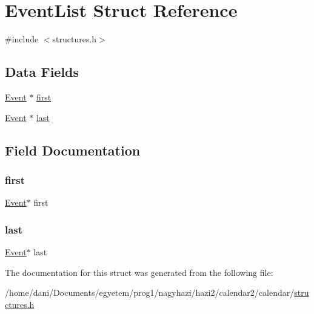 \hypertarget{struct_event_list}{}\section{Event\+List Struct Reference}
\label{struct_event_list}


{\ttfamily \#include $<$structures.\+h$>$}

\subsection*{Data Fields}
\begin{DoxyCompactItemize}
\item 
\hyperlink{struct_event}{Event} $\ast$ \hyperlink{struct_event_list_ab866d72c6e161e5eb85d4940b0dbc62e}{first}
\item 
\hyperlink{struct_event}{Event} $\ast$ \hyperlink{struct_event_list_a8e52f53a3606d45d86182ce606e9369d}{last}
\end{DoxyCompactItemize}


\subsection{Field Documentation}
\mbox{\label{struct_event_list_ab866d72c6e161e5eb85d4940b0dbc62e}} 
\subsubsection{\texorpdfstring{first}{first}}
{\footnotesize\ttfamily \hyperlink{struct_event}{Event}$\ast$ first}

\mbox{\label{struct_event_list_a8e52f53a3606d45d86182ce606e9369d}} 
\subsubsection{\texorpdfstring{last}{last}}
{\footnotesize\ttfamily \hyperlink{struct_event}{Event}$\ast$ last}



The documentation for this struct was generated from the following file\+:\begin{DoxyCompactItemize}
\item 
/home/dani/\+Documents/egyetem/prog1/nagyhazi/hazi2/calendar2/calendar/\hyperlink{structures_8h}{structures.\+h}\end{DoxyCompactItemize}
